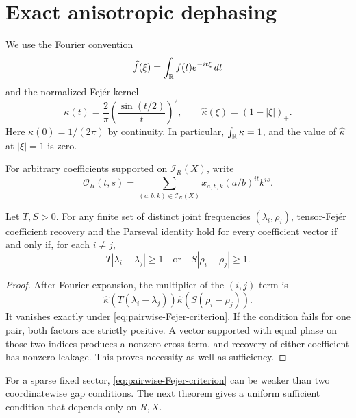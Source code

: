 \section{Exact anisotropic dephasing}
\label{sec:two-dimensional-dephasing}

We use the Fourier convention
\[
 \widehat f(\xi)=\int_\mathbb R f(t)e^{-it\xi}\,dt
\]
and the normalized Fej\'er kernel
\begin{equation}
\kappa(t)=\frac2\pi\left(\frac{\sin(t/2)}t\right)^2,
\qquad
\widehat\kappa(\xi)=(1-|\xi|)_+.
\label{eq:Fejer-kernel}
\end{equation}
Here $\kappa(0)=1/(2\pi)$ by continuity.  In particular,
$\int_\mathbb R\kappa=1$, and the value of
$\widehat\kappa$ at $|\xi|=1$ is zero.

For arbitrary coefficients supported on $\mathscr I_R(X)$, write
\begin{equation}
\mathscr O_R(t,s)=
 \sum_{(a,b,k)\in\mathscr I_R(X)}
 x_{a,b,k}(a/b)^{it}k^{is}.
\label{eq:sector-observation}
\end{equation}

\begin{proposition}
\label{prop:pairwise-Fejer-criterion}
Let $T,S>0$.  For any finite set of distinct joint frequencies
$(\lambda_i,\rho_i)$, tensor-Fej\'er coefficient recovery and the
Parseval identity hold for every coefficient vector if and only if, for
each $i\ne j$,
\begin{equation}
 T|\lambda_i-\lambda_j|\geq1
 \quad\text{or}\quad
 S|\rho_i-\rho_j|\geq1.
 \label{eq:pairwise-Fejer-criterion}
\end{equation}
\end{proposition}

\begin{proof}
After Fourier expansion, the multiplier of the $(i,j)$ term is
\[
 \widehat\kappa(T(\lambda_i-\lambda_j))
 \widehat\kappa(S(\rho_i-\rho_j)).
\]
It vanishes exactly under \eqref{eq:pairwise-Fejer-criterion}.  If the
condition fails for one pair, both factors are strictly positive.  A
vector supported with equal phase on those two indices produces a
nonzero cross term, and recovery of either coefficient has nonzero
leakage.  This proves necessity as well as sufficiency.
\end{proof}

For a sparse fixed sector, \eqref{eq:pairwise-Fejer-criterion} can be
weaker than two coordinatewise gap conditions.  The next theorem gives
a uniform sufficient condition that depends only on $R,X$.

